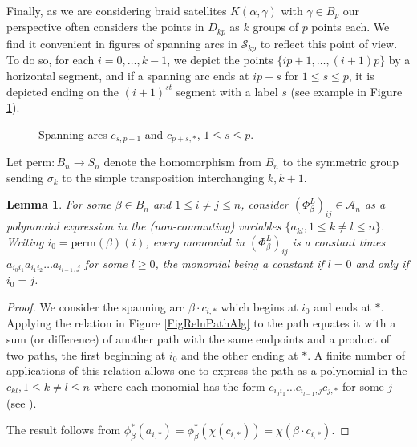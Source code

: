 \documentclass[11pt]{amsart}
\def\A{{\mathcal A}}
\def\s{{\sigma}}
\newtheorem{lem}[thm]{Lemma}
\theoremstyle{definition}
\begin{document}
  Finally, as we are considering braid satellites $K(\alpha,\gamma)$ with $\gamma\in B_p$ our perspective often considers the points in $D_{kp}$ as $k$ groups of $p$ points each. We find it convenient in figures of spanning arcs in $\mathscr S_{kp}$ to reflect this point of view. To do so, for each $i=0,\ldots,k-1$, we depict the points $\{ip+1,\ldots, (i+1)p\}$ by a horizontal segment, and if a spanning arc ends at $ip+s$ for $1\le s\le p$, it is depicted ending on the $(i+1)^{st}$ segment with a label $s$ (see example in Figure \ref{FigExSpanArckp}).

  \begin{figure}[ht]
      \caption{Spanning arcs $c_{s,p+1}$ and $c_{p+s,\ast}$, $1\le s\le p$.}
      \label{FigExSpanArckp}
    \end{figure}

  Let $\text{perm}:B_n\to S_n$ denote the homomorphism from $B_n$ to the symmetric group sending $\s_k$ to the simple transposition interchanging $k, k+1$.

  \begin{lem} For some $\beta\in B_n$ and $1\le i\ne j\le n$, consider $(\Phi_\beta^L)_{ij}\in \A_n$ as a polynomial expression in the (non-commuting) variables $\{a_{kl}, 1\le k\ne l\le n\}$. Writing $i_0=\text{perm}(\beta)(i)$, every monomial in $(\Phi_\beta^L)_{ij}$ is a constant times $a_{i_0i_1}a_{i_1i_2}\ldots a_{i_{l-1},j}$ for some $l\ge 0$, the monomial being a constant if $l=0$ and only if $i_0=j$.
  \label{lem:monomial}
  \end{lem}
  \begin{proof}We consider the spanning arc $\beta\cdot c_{i,\ast}$ which begins at $i_0$ and ends at $\ast$. Applying the relation in Figure \ref{FigRelnPathAlg} to the path equates it with a sum (or difference) of another path with the same endpoints and a product of two paths, the first beginning at $i_0$ and the other ending at $\ast$. A finite number of applications of this relation allows one to express the path as a polynomial in the $c_{kl}, 1\le k\ne l\le n$ where each monomial has the form $c_{i_0i_1}\ldots c_{i_{l-1},j}c_{j,\ast}$ for some $j$ (see \cite[Lemma 2.6]{Ng05b}). 

  The result follows from $\phi^\ast_\beta(a_{i,\ast}) = \phi^\ast_\beta(\chi(c_{i,\ast})) = \chi(\beta\cdot c_{i,\ast})$.
  \end{proof}
\end{document}
